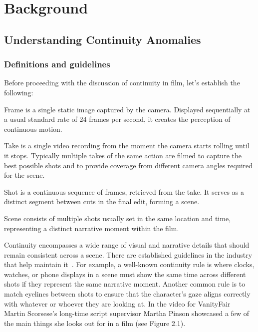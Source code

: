 \chapter{Background}
\label{ch:background}

\section{Understanding Continuity Anomalies}

\subsection{Definitions and guidelines}

Before proceeding with the discussion of continuity in film, let's establish the following:

Frame is a single static image captured by the camera. Displayed sequentially at a usual standard rate of 24 frames per second, it creates the perception of continuous motion.

Take is a single video recording from the moment the camera starts rolling until it stops. Typically multiple takes of the same action are filmed to capture the best possible shots and to provide coverage from different camera angles required for the scene.

Shot is a continuous sequence of frames, retrieved from the take. It serves as a distinct segment between cuts in the final edit, forming a scene.

Scene consists of multiple shots usually set in the same location and time, representing a distinct narrative moment within the film.

Continuity encompasses a wide range of visual and narrative details that should remain consistent across a scene. There are established guidelines in the industry that help maintain it~\cite{miller1999}. For example, a well-known continuity rule is where clocks, watches, or phone displays in a scene must show the same time across different shots if they represent the same narrative moment. Another common rule is to match eyelines between shots to ensure that the character's gaze aligns correctly with whatever or whoever they are looking at. In the video for VanityFair~\cite{vanityfair2023} Martin Scorsese's long-time script supervisor Martha Pinson showcased a few of the main things she looks out for in a film (see Figure 2.1).

